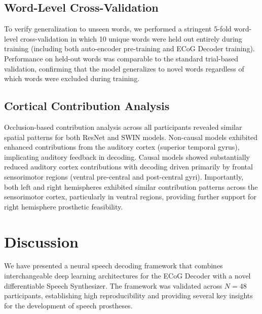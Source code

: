 \documentclass[11pt]{article}
\begin{document}
\subsection{Word-Level Cross-Validation}

To verify generalization to unseen words, we performed a stringent 5-fold word-level cross-validation in which 10 unique words were held out entirely during training (including both auto-encoder pre-training and ECoG Decoder training). Performance on held-out words was comparable to the standard trial-based validation, confirming that the model generalizes to novel words regardless of which words were excluded during training.

\subsection{Cortical Contribution Analysis}

Occlusion-based contribution analysis across all participants revealed similar spatial patterns for both ResNet and SWIN models. Non-causal models exhibited enhanced contributions from the auditory cortex (superior temporal gyrus), implicating auditory feedback in decoding. Causal models showed substantially reduced auditory cortex contributions with decoding driven primarily by frontal sensorimotor regions (ventral pre-central and post-central gyri). Importantly, both left and right hemispheres exhibited similar contribution patterns across the sensorimotor cortex, particularly in ventral regions, providing further support for right hemisphere prosthetic feasibility.

\section{Discussion}

We have presented a neural speech decoding framework that combines interchangeable deep learning architectures for the ECoG Decoder with a novel differentiable Speech Synthesizer. The framework was validated across $N=48$ participants, establishing high reproducibility and providing several key insights for the development of speech prostheses.
\end{document}

